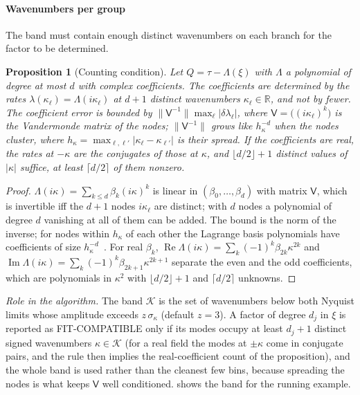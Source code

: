 \documentclass[11pt]{article}
\theoremstyle{plain}
\newtheorem{proposition}[theorem]{Proposition}
\theoremstyle{definition}
\theoremstyle{remark}
\newcommand{\R}{\mathbb{R}}
\newcommand{\sigbin}{\sigma_{\kappa}}       %
\newcommand{\lab}[1]{\textsf{#1}}           %
\newcommand{\FC}{\lab{FIT-COMPATIBLE}}
\newcommand{\abs}[1]{\lvert#1\rvert}
\newcommand{\norm}[1]{\lVert#1\rVert}
\newcommand{\roleinalg}[1]{\par\noindent\emph{Role in the algorithm.} #1\par}
\begin{document}
\paragraph{Wavenumbers per group}
The band must contain enough distinct wavenumbers on each branch for the factor to be determined.

\begin{proposition}[Counting condition]\label{prop:counting}
Let $Q=\tau-\Lambda(\xi)$ with $\Lambda$ a polynomial of degree at most $d$ with complex coefficients. The
coefficients are determined by the rates $\lambda(\kappa_\ell)=\Lambda(i\kappa_\ell)$ at $d+1$ distinct wavenumbers
$\kappa_\ell\in\R$, and not by fewer. The coefficient error is bounded by $\norm{\mathsf V^{-1}}\max_\ell\abs{\delta\lambda_\ell}$,
where $\mathsf V=\big((i\kappa_\ell)^k\big)$ is the Vandermonde matrix of the nodes; $\norm{\mathsf V^{-1}}$ grows like
$h_\kappa^{-d}$ when the nodes cluster, where $h_\kappa=\max_{\ell,\ell'}\abs{\kappa_\ell-\kappa_{\ell'}}$ is their spread. If the coefficients are real, the rates at
$-\kappa$ are the conjugates of those at $\kappa$, and $\lfloor d/2\rfloor+1$ distinct values of $\abs{\kappa}$ suffice,
at least $\lceil d/2\rceil$ of them nonzero.
\end{proposition}

\begin{proof}
$\Lambda(i\kappa)=\sum_{k\le d}\beta_k(i\kappa)^k$ is linear in $(\beta_0,\dots,\beta_d)$ with matrix $\mathsf V$,
which is invertible iff the $d+1$ nodes $i\kappa_\ell$ are distinct; with $d$ nodes a polynomial of
degree $d$ vanishing at all of them can be added. The bound is the norm of the inverse; for nodes
within $h_\kappa$ of each other the Lagrange basis polynomials have coefficients of size
$h_\kappa^{-d}$~\cite{Gau62}. For real $\beta_k$, $\operatorname{Re}\Lambda(i\kappa)=\sum_k(-1)^k\beta_{2k}\kappa^{2k}$ and
$\operatorname{Im}\Lambda(i\kappa)=\sum_k(-1)^k\beta_{2k+1}\kappa^{2k+1}$ separate the even and the odd coefficients, which are
polynomials in $\kappa^2$ with $\lfloor d/2\rfloor+1$ and $\lceil d/2\rceil$ unknowns.
\end{proof}

\roleinalg{The band $\mathcal K$ is the set of wavenumbers below both Nyquist limits whose amplitude
exceeds $z\,\sigbin$ (default $z=3$). A factor of degree $d_j$ in $\xi$ is reported as \FC{}
only if its modes occupy at least $d_j+1$ distinct signed wavenumbers $\kappa\in\mathcal K$ (for a real field the
modes at $\pm\kappa$ come in conjugate pairs, and the rule then implies the real-coefficient count of the proposition), and the whole band is
used rather than the cleanest few bins, because spreading the nodes is what keeps $\mathsf V$ well
conditioned. \Cref{fig:nyquist} shows the band for the running example.}
\end{document}
